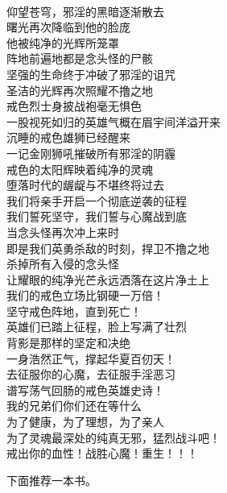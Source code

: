\begin{poem}[戒色英雄史诗]
    \begin{multicols}{2}
        \begin{center}~\\
            仰望苍穹，邪淫的黑暗逐渐散去 \\ 曙光再次降临到他的脸庞 \\ 他被纯净的光辉所笼罩 \\ 阵地前遍地都是念头怪的尸骸 \\ 坚强的生命终于冲破了邪淫的诅咒 \\ 圣洁的光辉再次照耀不撸之地 \\ 戒色烈士身披战袍毫无惧色 \\ 一股视死如归的英雄气概在眉宇间洋溢开来 \\ 沉睡的戒色雄狮已经醒来 \\ 一记金刚狮吼摧破所有邪淫的阴霾 \\ 戒色的太阳辉映着纯净的灵魂 \\ 堕落时代的龌龊与不堪终将过去 \\ 我们将亲手开启一个彻底逆袭的征程 \\ 我们誓死坚守，我们誓与心魔战到底 \\ 当念头怪再次冲上来时 \\ 即是我们英勇杀敌的时刻，捍卫不撸之地 \\ 杀掉所有入侵的念头怪 \\ 让耀眼的纯净光芒永远洒落在这片净土上 \\ 我们的戒色立场比钢硬一万倍！ \\ 坚守戒色阵地，直到死亡！ \\ 英雄们已踏上征程，脸上写满了壮烈 \\ 背影是那样的坚定和决绝 \\ 一身浩然正气，撑起华夏百仞天！ \\ 去征服你的心魔，去征服手淫恶习 \\ 谱写荡气回肠的戒色英雄史诗！ \\ 我的兄弟们你们还在等什么 \\ 为了健康，为了理想，为了亲人 \\ 为了灵魂最深处的纯真无邪，猛烈战斗吧！ \\ 戒出你的血性！战胜心魔！重生！！！
        \end{center}
    \end{multicols}
\end{poem}

下面推荐一本书。

